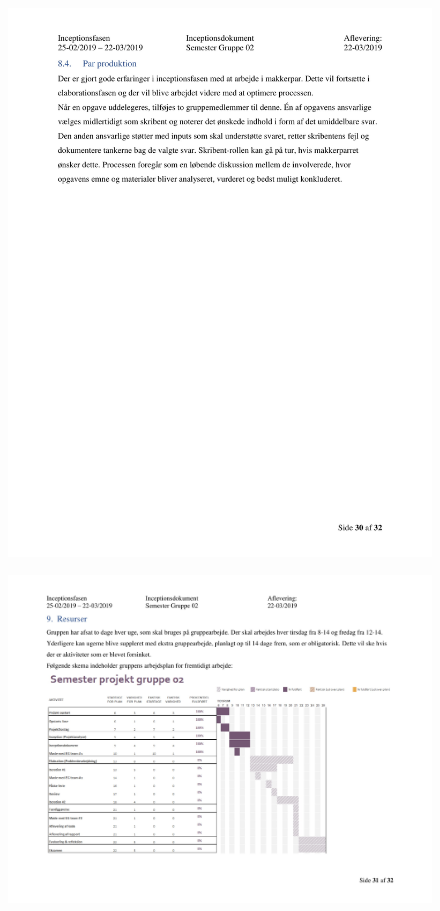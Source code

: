 \begin{figure}[hb]
  \includegraphics[scale = 0.33]{./PNG/Inceptions/Gruppe02+InceptionsDokument-31.jpg} 
\end{figure}

\begin{landscape}
\begin{figure}[hb]
  \includegraphics[scale = 0.33]{./PNG/Inceptions/Gruppe02+InceptionsDokument-32.jpg} 
\end{figure}
\end{landscape}

